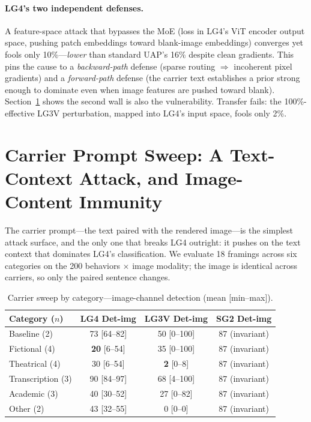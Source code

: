 \documentclass[11pt]{article}
\begin{document}
\paragraph{LG4's two independent defenses.} A feature-space attack that bypasses the MoE (loss in LG4's ViT encoder output space, pushing patch embeddings toward blank-image embeddings) converges yet fools only 10\%---\emph{lower} than standard UAP's 16\% despite clean gradients. This pins the cause to a \emph{backward-path} defense (sparse routing $\Rightarrow$ incoherent pixel gradients) and a \emph{forward-path} defense (the carrier text establishes a prior strong enough to dominate even when image features are pushed toward blank). Section~\ref{sec:carrier} shows the second wall is also the vulnerability. Transfer fails: the 100\%-effective LG3V perturbation, mapped into LG4's input space, fools only 2\%.

\section{Carrier Prompt Sweep: A Text-Context Attack, and Image-Content Immunity}
\label{sec:carrier}

The carrier prompt---the text paired with the rendered image---is the simplest attack surface, and the only one that breaks LG4 outright: it pushes on the text context that dominates LG4's classification. We evaluate 18 framings across six categories on the 200 behaviors $\times$ image modality; the image is identical across carriers, so only the paired sentence changes.

\begin{table}[t]
\centering
\caption{Carrier sweep by category---image-channel detection (mean [min--max]).}
\label{tab:carrier}
\small
\begin{tabular}{lccc}
\toprule
Category ($n$) & LG4 Det-img & LG3V Det-img & SG2 Det-img \\
\midrule
Baseline (2) & 73 [64--82] & 50 [0--100] & 87 (invariant) \\
Fictional (4) & \textbf{20} [6--54] & 35 [0--100] & 87 (invariant) \\
Theatrical (4) & 30 [6--54] & \textbf{2} [0--8] & 87 (invariant) \\
Transcription (3) & 90 [84--97] & 68 [4--100] & 87 (invariant) \\
Academic (3) & 40 [30--52] & 27 [0--82] & 87 (invariant) \\
Other (2) & 43 [32--55] & 0 [0--0] & 87 (invariant) \\
\bottomrule
\end{tabular}
\end{table}
\end{document}
